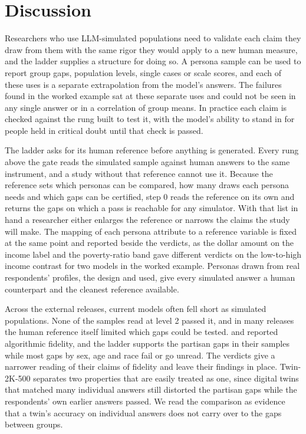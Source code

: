 
\section{Discussion}
\label{sec:discussion}

Researchers who use LLM-simulated populations need to validate each claim they draw from them with the same rigor they would apply to a new human measure, and the ladder supplies a structure for doing so.
A persona sample can be used to report group gaps, population levels, single cases or scale scores, and each of these uses is a separate extrapolation from the model's answers.
The failures found in the worked example sat at these separate uses and could not be seen in any single answer or in a correlation of group means.
In practice each claim is checked against the rung built to test it, with the model's ability to stand in for people held in critical doubt until that check is passed.

The ladder asks for its human reference before anything is generated.
Every rung above the gate reads the simulated sample against human answers to the same instrument, and a study without that reference cannot use it.
Because the reference sets which personas can be compared, how many draws each persona needs and which gaps can be certified, step 0 reads the reference on its own and returns the gaps on which a pass is reachable for any simulator.
With that list in hand a researcher either enlarges the reference or narrows the claims the study will make.
The mapping of each persona attribute to a reference variable is fixed at the same point and reported beside the verdicts, as the dollar amount on the income label and the poverty-ratio band gave different verdicts on the low-to-high income contrast for two models in the worked example. %
Personas drawn from real respondents' profiles, the design \citet{bisbee2024synthetic} and \citet{argyle2023outofone} used, give every simulated answer a human counterpart and the cleanest reference available.

Across the external releases, current models often fell short as simulated populations.
None of the samples read at level 2 passed it, and in many releases the human reference itself limited which gaps could be tested.
\citet{bisbee2024synthetic} and \citet{argyle2023outofone} reported algorithmic fidelity, and the ladder supports the partisan gaps in their samples while most gaps by sex, age and race fail or go unread.
The verdicts give a narrower reading of their claims of fidelity and leave their findings in place.
Twin-2K-500 separates two properties that are easily treated as one, since digital twins that matched many individual answers still distorted the partisan gaps while the respondents' own earlier answers passed. %
We read the comparison as evidence that a twin's accuracy on individual answers does not carry over to the gaps between groups.

